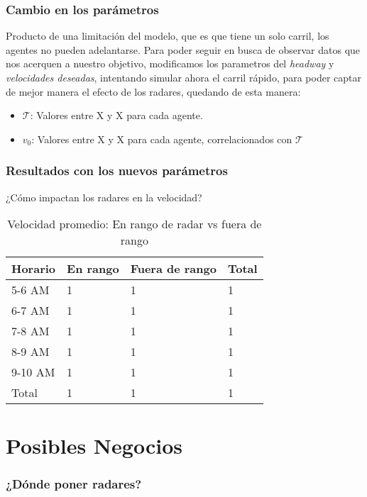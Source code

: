 \documentclass[10pt, compress]{beamer}
\begin{document}
\begin{frame}
\frametitle{Cambio en los par\'ametros}

Producto de una limitaci\'on del modelo, que es que tiene un solo carril, los agentes no pueden adelantarse. Para poder seguir en busca de observar datos que nos acerquen a nuestro objetivo, modificamos los parametros del \textit{headway} y \textit{velocidades deseadas}, intentando simular ahora el carril r\'apido, para poder captar de mejor manera el efecto de los radares, quedando de esta manera:

\begin{itemize}
\item $\mathcal{T}$: Valores entre X y X para cada agente.
\item $v_0$: Valores entre X y X para cada agente, correlacionados con $\mathcal{T}$
\end{itemize}

\end{frame}

\begin{frame}
\frametitle{Resultados con los nuevos par\'ametros}
\end{frame}

\begin{frame}{¿C\'omo impactan los radares en la velocidad?}
  \begin{table}
    \caption{Velocidad promedio: En rango de radar vs fuera de rango}
    \begin{tabular}{llll}
      \toprule
      Horario & En rango & Fuera de rango & Total \\
      \midrule
      5-6 AM & 1 & 1 & 1\\
      6-7 AM & 1 & 1 & 1\\
      7-8 AM & 1 & 1 & 1\\
      8-9 AM & 1 & 1 & 1\\
      9-10 AM & 1 & 1 & 1\\
      Total & 1 & 1 & 1\\
      \bottomrule
    \end{tabular}
  \end{table}
\end{frame}

\section{Posibles Negocios}

\begin{frame}
\frametitle{¿D\'onde poner radares?}
\end{frame}
\end{document}
